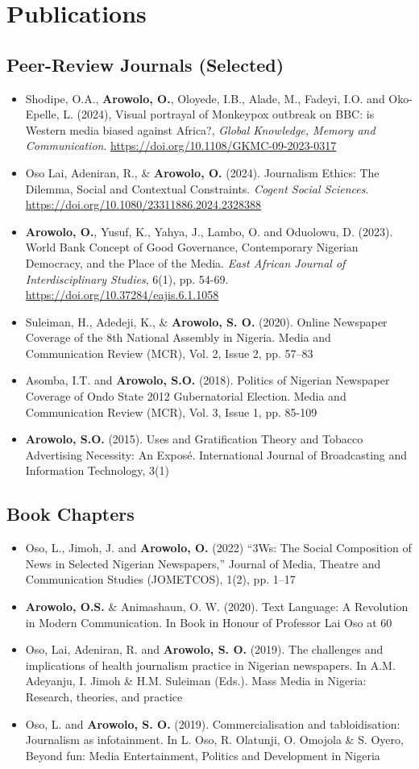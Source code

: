 \documentclass[a4paper,11pt]{article}
\newcommand{\resumeItem}[1]{
  \item\small{
    {#1 \vspace{-2pt}}
  }
}
\newcommand{\resumeItemListStart}{\begin{itemize}}
\newcommand{\resumeItemListEnd}{\end{itemize}\vspace{-5pt}}
\begin{document}
\section{Publications}
\subsection{Peer-Review Journals (Selected)}
    \resumeItemListStart
        \resumeItem{Shodipe, O.A., \textbf{Arowolo, O.}, Oloyede, I.B., Alade, M., Fadeyi, I.O. and Oko-Epelle, L. (2024), Visual portrayal of Monkeypox outbreak on BBC: is Western media biased against Africa?, \textit{Global Knowledge, Memory and Communication}. \href{https://doi.org/10.1108/GKMC-09-2023-0317}{https://doi.org/10.1108/GKMC-09-2023-0317}}
        \resumeItem{Oso Lai, Adeniran, R., \& \textbf{Arowolo, O.} (2024). Journalism Ethics: The Dilemma, Social and Contextual Constraints. \textit{Cogent Social Sciences}. \href{https://doi.org/10.1080/23311886.2024.2328388}{https://doi.org/10.1080/23311886.2024.2328388}}
        \resumeItem{\textbf{Arowolo, O.}, Yusuf, K., Yahya, J., Lambo, O. and Oduolowu, D. (2023). World Bank Concept of Good Governance, Contemporary Nigerian Democracy, and the Place of the Media. \textit{East African Journal of Interdisciplinary Studies}, 6(1), pp. 54-69. \href{https://doi.org/10.37284/eajis.6.1.1058}{https://doi.org/10.37284/eajis.6.1.1058}}
        \resumeItem{Suleiman, H., Adedeji, K., \& \textbf{Arowolo, S. O.} (2020). Online Newspaper Coverage of the 8th National Assembly in Nigeria. Media and Communication Review (MCR), Vol. 2, Issue 2, pp. 57–83}
        \resumeItem{Asomba, I.T. and \textbf{Arowolo, S.O.} (2018). Politics of Nigerian Newspaper Coverage of Ondo State 2012 Gubernatorial Election. Media and Communication Review (MCR), Vol. 3, Issue 1, pp. 85-109}
        \resumeItem{\textbf{Arowolo, S.O.} (2015). Uses and Gratification Theory and Tobacco Advertising Necessity: An Exposé. International Journal of Broadcasting and Information Technology, 3(1)}
    \resumeItemListEnd

\subsection{Book Chapters}
    \resumeItemListStart
        \resumeItem{Oso, L., Jimoh, J. and \textbf{Arowolo, O.} (2022) ``3Ws: The Social Composition of News in Selected Nigerian Newspapers,'' Journal of Media, Theatre and Communication Studies (JOMETCOS), 1(2), pp. 1–17}
        \resumeItem{\textbf{Arowolo, O.S.} \& Animashaun, O. W. (2020). Text Language: A Revolution in Modern Communication. In Book in Honour of Professor Lai Oso at 60}
        \resumeItem{Oso, Lai, Adeniran, R. and \textbf{Arowolo, S. O.} (2019). The challenges and implications of health journalism practice in Nigerian newspapers. In A.M. Adeyanju, I. Jimoh \& H.M. Suleiman (Eds.). Mass Media in Nigeria: Research, theories, and practice}
        \resumeItem{Oso, L. and \textbf{Arowolo, S. O.} (2019). Commercialisation and tabloidisation: Journalism as infotainment. In L. Oso, R. Olatunji, O. Omojola \& S. Oyero, Beyond fun: Media Entertainment, Politics and Development in Nigeria}
    \resumeItemListEnd
\end{document}
